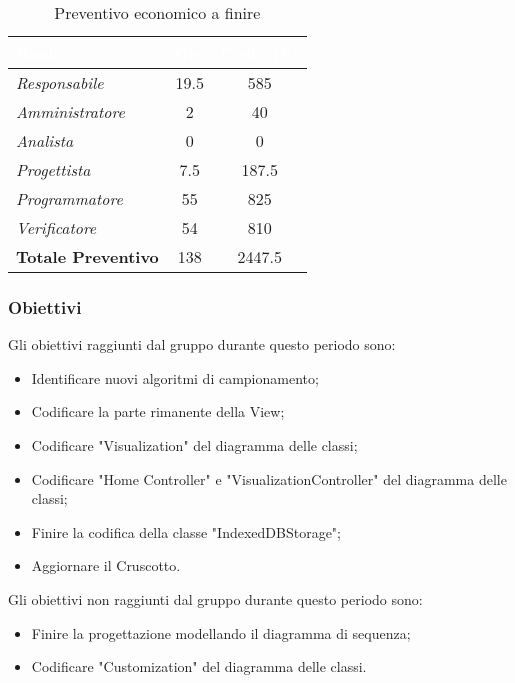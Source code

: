 \begin{table}[H]
    \renewcommand\arraystretch{1.5}
    \centering
    \begin{tabular}{|l|c|c|}
    \hline
    \rowcolor[HTML]{036400}
    \textcolor{white}{\textbf{Ruolo}} & \multicolumn{1}{l|}{\textcolor{white}{\textbf{Ore}}} & \multicolumn{1}{l|}{\textcolor{white}{\textbf{Costo (€)}}} \\ \hline
    \rowcolor[HTML]{EFEFEF}\textit{Responsabile}      & 19.5            & 585                 \\ \hline
    \rowcolor[HTML]{C0C0C0}\textit{Amministratore}    & 2               & 40                 \\ \hline
    \rowcolor[HTML]{EFEFEF}\textit{Analista}          & 0               & 0                 \\ \hline
    \rowcolor[HTML]{C0C0C0}\textit{Progettista}       & 7.5             & 187.5                 \\ \hline
    \rowcolor[HTML]{EFEFEF}\textit{Programmatore}     & 55              & 825                 \\ \hline
    \rowcolor[HTML]{C0C0C0}\textit{Verificatore}      & 54              & 810                 \\ \hline
    \rowcolor[HTML]{EFEFEF}\textbf{Totale Preventivo} & 138             & 2447.5            \\ \hline
    \end{tabular}
    \caption{Preventivo economico a finire}
\end{table}

\subsubsection{Obiettivi}
Gli obiettivi raggiunti dal gruppo durante questo periodo sono:
\begin{itemize}
    \item Identificare nuovi algoritmi di campionamento;
    \item Codificare la parte rimanente della View;
    \item Codificare "Visualization" del diagramma delle classi;
    \item Codificare "Home Controller" e "VisualizationController" del diagramma delle classi;
    \item Finire la codifica della classe "IndexedDBStorage";
    \item Aggiornare il Cruscotto.
\end{itemize}
Gli obiettivi non raggiunti dal gruppo durante questo periodo sono:
\begin{itemize}
    \item Finire la progettazione modellando il diagramma di sequenza;
    \item Codificare "Customization" del diagramma delle classi.
\end{itemize}

